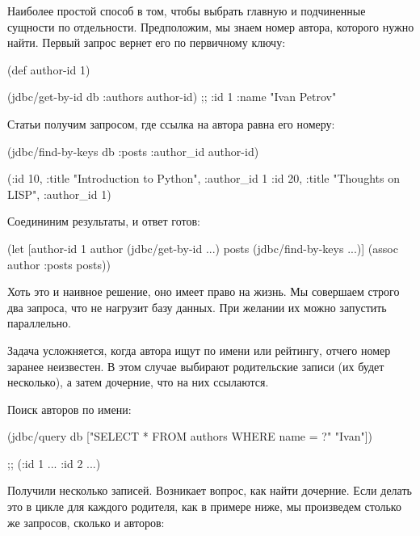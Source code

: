 Наиболее простой способ в том, чтобы выбрать главную и подчиненные сущности по отдельности. Предположим, мы знаем номер автора, которого нужно найти. Первый запрос вернет его по первичному ключу:

\begin{english}
  \begin{clojure}
(def author-id 1)

(jdbc/get-by-id db :authors author-id)
;; {:id 1 :name "Ivan Petrov"}
  \end{clojure}
\end{english}

Статьи получим запросом, где ссылка на автора равна его номеру:

\begin{english}
  \begin{clojure}
(jdbc/find-by-keys db :posts {:author_id author-id})

({:id 10, :title "Introduction to Python", :author_id 1}
 {:id 20, :title "Thoughts on LISP", :author_id 1})
  \end{clojure}
\end{english}

Соедининим результаты, и ответ готов:

\begin{english}
  \begin{clojure}
(let [author-id 1
      author (jdbc/get-by-id ...)
      posts (jdbc/find-by-keys ...)]
  (assoc author :posts posts))
  \end{clojure}
\end{english}

Хоть это и наивное решение, оно имеет право на жизнь. Мы совершаем строго два запроса, что не нагрузит базу данных. При желании их можно запустить параллельно.

Задача усложняется, когда автора ищут по имени или рейтингу, отчего номер заранее неизвестен. В этом случае выбирают родительские записи (их будет несколько), а затем дочерние, что на них ссылаются.

Поиск авторов по имени:

\begin{english}
  \begin{clojure}
(jdbc/query db ["SELECT * FROM authors
                 WHERE name = ?" "Ivan"])

;; ({:id 1 ...} {:id 2 ...})
  \end{clojure}
\end{english}

Получили несколько записей. Возникает вопрос, как найти дочерние. Если делать это в цикле для каждого родителя, как в примере ниже, мы произведем столько же запросов, сколько и авторов:

